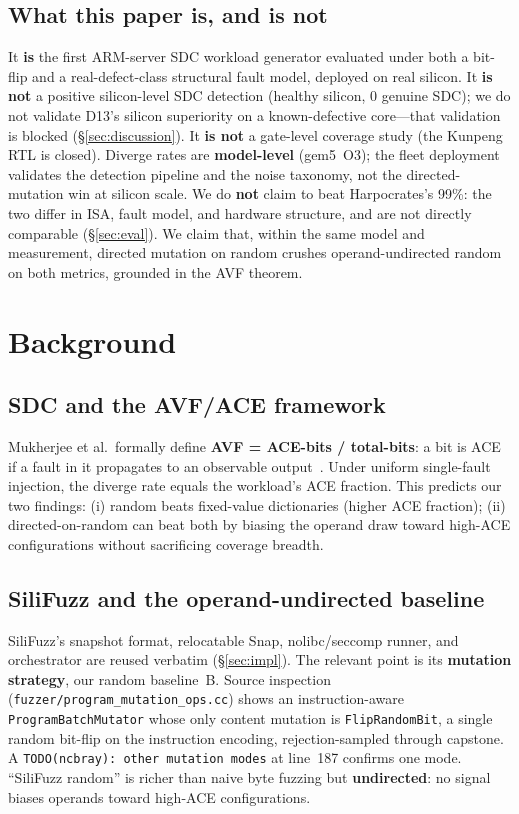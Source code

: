 \documentclass[sigplan,review,anonymous]{acmart}
\begin{document}
\subsection{What this paper is, and is not}
It \textbf{is} the first ARM-server SDC workload generator evaluated under both a bit-flip and a real-defect-class structural fault model, deployed on real silicon. It \textbf{is not} a positive silicon-level SDC detection (healthy silicon, 0 genuine SDC); we do not validate D13's silicon superiority on a known-defective core---that validation is blocked (\S\ref{sec:discussion}). It \textbf{is not} a gate-level coverage study (the Kunpeng RTL is closed). Diverge rates are \textbf{model-level} (gem5~O3); the fleet deployment validates the detection pipeline and the noise taxonomy, not the directed-mutation win at silicon scale. We do \textbf{not} claim to beat Harpocrates's 99\%: the two differ in ISA, fault model, and hardware structure, and are not directly comparable (\S\ref{sec:eval}). We claim that, within the same model and measurement, directed mutation on random crushes operand-undirected random on both metrics, grounded in the AVF theorem.

\section{Background}
\label{sec:background}

\subsection{SDC and the AVF/ACE framework}
Mukherjee et al.\ formally define \textbf{AVF = ACE-bits / total-bits}: a bit is ACE if a fault in it propagates to an observable output~\cite{avf_mukherjee_micro03}. Under uniform single-fault injection, the diverge rate equals the workload's ACE fraction. This predicts our two findings: (i) random beats fixed-value dictionaries (higher ACE fraction); (ii) directed-on-random can beat both by biasing the operand draw toward high-ACE configurations without sacrificing coverage breadth.

\subsection{SiliFuzz and the operand-undirected baseline}
SiliFuzz's snapshot format, relocatable Snap, nolibc/seccomp runner, and orchestrator are reused verbatim (\S\ref{sec:impl}). The relevant point is its \textbf{mutation strategy}, our random baseline~B. Source inspection (\texttt{fuzzer/program\_mutation\_ops.cc}) shows an instruction-aware \texttt{ProgramBatchMutator} whose only content mutation is \texttt{FlipRandomBit}, a single random bit-flip on the instruction encoding, rejection-sampled through capstone. A \texttt{TODO(ncbray): other mutation modes} at line~187 confirms one mode. ``SiliFuzz random'' is richer than naive byte fuzzing but \textbf{undirected}: no signal biases operands toward high-ACE configurations.
\end{document}
